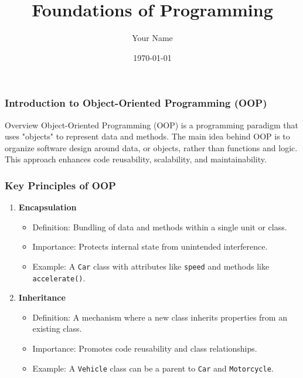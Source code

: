 \documentclass{beamer}
\title{Foundations of Programming}
\author{Your Name}
\institute{Your Institution}
\date{\today}
\begin{document}
\frame{\titlepage}

\begin{frame}[fragile]
    \frametitle{Introduction to Object-Oriented Programming (OOP)}
    \begin{block}{Overview}
        Object-Oriented Programming (OOP) is a programming paradigm that uses "objects" to represent data and methods. 
        The main idea behind OOP is to organize software design around data, or objects, rather than functions and logic. 
        This approach enhances code reusability, scalability, and maintainability.
    \end{block}
\end{frame}

\begin{frame}[fragile]
    \frametitle{Key Principles of OOP}
    \begin{enumerate}
        \item \textbf{Encapsulation}
            \begin{itemize}
                \item Definition: Bundling of data and methods within a single unit or class.
                \item Importance: Protects internal state from unintended interference.
                \item Example: A \texttt{Car} class with attributes like \texttt{speed} and methods like \texttt{accelerate()}.
            \end{itemize}
        
        \item \textbf{Inheritance}
            \begin{itemize}
                \item Definition: A mechanism where a new class inherits properties from an existing class.
                \item Importance: Promotes code reusability and class relationships.
                \item Example: A \texttt{Vehicle} class can be a parent to \texttt{Car} and \texttt{Motorcycle}.
            \end{itemize}
    \end{enumerate}
\end{frame}
\end{document}
